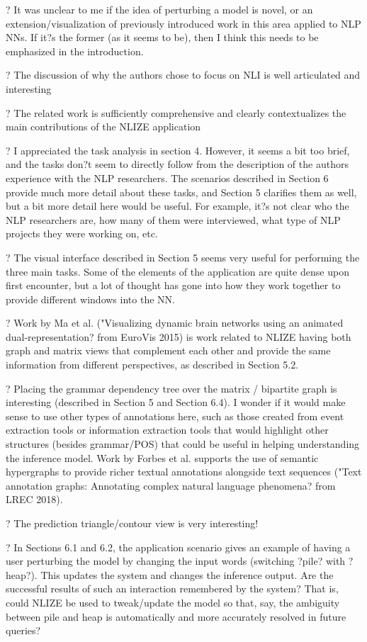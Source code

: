 ? It was unclear to me if the idea of perturbing a model is novel, or an extension/visualization of previously introduced work in this area applied to NLP NNs. If it?s the former (as it seems to be), then I think this needs to be emphasized in the introduction.

? The discussion of why the authors chose to focus on NLI is well articulated and interesting

? The related work is sufficiently comprehensive and clearly contextualizes the main contributions of the NLIZE application

? I appreciated the task analysis in section 4. However, it seems a bit too brief, and the tasks don?t seem to directly follow from the description of the authors experience with the NLP researchers. The scenarios described in Section 6 provide much more detail about these tasks, and Section 5 clarifies them as well, but a bit more detail here would be useful. For example, it?s not clear who the NLP researchers are, how many of them were interviewed, what type of NLP projects they were working on, etc. 

? The visual interface described in Section 5 seems very useful for performing the three main tasks. Some of the elements of the application are quite dense upon first encounter, but a lot of thought has gone into how they work together to provide different windows into the NN. 

? Work by Ma et al. ("Visualizing dynamic brain networks using an animated dual-representation? from EuroVis 2015) is work related to NLIZE having both graph and matrix views that complement each other and provide the same information from different perspectives, as described in Section 5.2.

? Placing the grammar dependency tree over the matrix / bipartite graph is interesting (described in Section 5 and Section 6.4). I wonder if it would make sense to use other types of annotations here, such as those created from event extraction tools or information extraction tools that would highlight other structures (besides grammar/POS) that could be useful in helping understanding the inference model. Work by Forbes et al. supports the use of semantic hypergraphs to provide richer textual annotations alongside text sequences ("Text annotation graphs: Annotating complex natural language phenomena? from LREC 2018).

? The prediction triangle/contour view is very interesting!

? In Sections 6.1 and 6.2, the application scenario gives an example of having a user perturbing the model by changing the input words (switching ?pile? with ?heap?). This updates the system and changes the inference output. Are the successful results of such an interaction remembered by the system? That is, could NLIZE be used to tweak/update the model so that, say, the ambiguity between pile and heap is automatically and more accurately resolved in future queries?


